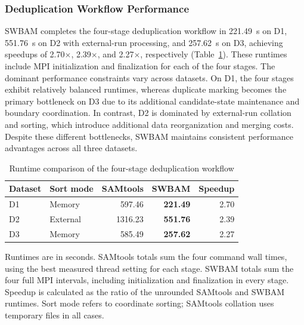 \documentclass[lettersize,journal]{IEEEtran}
\begin{document}
\subsubsection{Deduplication Workflow Performance}
SWBAM completes the four-stage deduplication workflow in 221.49~s on D1, 551.76~s on D2 with external-run processing, and 257.62~s on D3, achieving speedups of 2.70$\times$, 2.39$\times$, and 2.27$\times$, respectively (Table~\ref{tab:dedup-workflow}). 
These runtimes include MPI initialization and finalization for each of the four stages. The dominant performance constraints vary across datasets. 
On D1, the four stages exhibit relatively balanced runtimes, whereas duplicate marking becomes the primary bottleneck on D3 due to its additional candidate-state maintenance and boundary coordination. 
In contrast, D2 is dominated by external-run collation and sorting, which introduce additional data reorganization and merging costs. 
Despite these different bottlenecks, SWBAM maintains consistent performance advantages across all three datasets.

\begin{table}[!t]
\centering
\begin{threeparttable}
\caption{Runtime comparison of the four-stage deduplication workflow}
\label{tab:dedup-workflow}
\footnotesize
\setlength{\tabcolsep}{3pt}
\begin{tabular*}{\columnwidth}{@{\extracolsep{\fill}}llrrr@{}}
\toprule
Dataset & Sort mode & SAMtools & SWBAM & Speedup \\
\midrule
D1 & Memory & 597.46 & \textbf{221.49} & 2.70 \\
D2 & External & 1316.23 & \textbf{551.76} & 2.39 \\
D3 & Memory & 585.49 & \textbf{257.62} & 2.27 \\
\bottomrule
\end{tabular*}
\begin{tablenotes}[flushleft]
\scriptsize
\item Runtimes are in seconds.
SAMtools totals sum the four command wall times, using the best measured thread setting for each stage.
SWBAM totals sum the four full MPI intervals, including initialization and finalization in every stage.
Speedup is calculated as the ratio of the unrounded SAMtools and SWBAM runtimes.
Sort mode refers to coordinate sorting; SAMtools collation uses temporary files in all cases.
\end{tablenotes}
\end{threeparttable}
\end{table}
\end{document}
